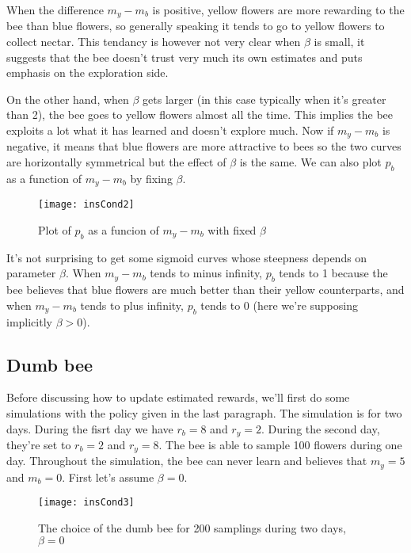 When the difference $m_y - m_b$ is positive, yellow flowers are more rewarding
to the bee than blue flowers, so generally speaking it tends to go to
yellow flowers to collect nectar. This tendancy is however not very clear when
$\beta$ is small, it suggests that the bee doesn't trust very much its own
estimates and puts emphasis on the exploration side. 

On the other hand, when
$\beta$ gets larger (in this case typically when it's greater than 2), the bee
goes to yellow flowers almost all the time. This implies the bee exploits a
lot what it has learned and doesn't explore much. Now if $m_y - m_b$ is
negative, it means that blue flowers are more attractive to bees so the two
curves are horizontally symmetrical but the effect of $\beta$ is the same.
We can also plot $p_b$ as a function of $m_y - m_b$ by fixing $\beta$.

\vspace{-1em}
\begin{figure}[H]
  \centering
  \texttt{[image: insCond2]}
  \caption {Plot of $p_b$ as a funcion of $m_y-m_b$ with fixed $\beta$}
\end{figure}

It's not surprising to get some sigmoid curves whose steepness depends on
parameter $\beta$. When $m_y - m_b$ tends to minus infinity, $p_b$ tends 
to 1 because the bee believes that blue flowers are much better than their 
yellow counterparts, and when $m_y - m_b$ tends to plus infinity, $p_b$ tends 
to 0 (here we're supposing implicitly $\beta > 0$).

\subsection{Dumb bee}

Before discussing how to update estimated rewards, we'll first do some
simulations with the policy given in the last paragraph. The simulation is for
two days. During the fisrt day we have $r_b = 8$ and $r_y = 2$. During the
second day, they're set to $r_b = 2$ and $r_y = 8$. The bee is able to sample
100 flowers during one day. Throughout the simulation, the bee can never learn
and believes that $m_y = 5$ and $m_b = 0$. First let's assume $\beta = 0$.

\begin{figure}[H]
  \centering
  \texttt{[image: insCond3]}
  \caption {The choice of the dumb bee for 200 samplings during two days, 
            $\beta = 0$}
\end{figure}

